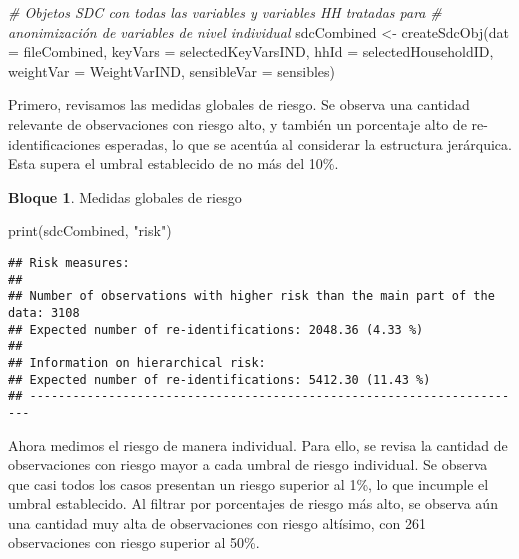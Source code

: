 \documentclass[
]{book}
\newenvironment{Shaded}{\begin{snugshade}}{\end{snugshade}}
\newcommand{\AttributeTok}[1]{\textcolor[rgb]{0.77,0.63,0.00}{#1}}
\newcommand{\CommentTok}[1]{\textcolor[rgb]{0.56,0.35,0.01}{\textit{#1}}}
\newcommand{\FunctionTok}[1]{\textcolor[rgb]{0.00,0.00,0.00}{#1}}
\newcommand{\NormalTok}[1]{#1}
\newcommand{\OtherTok}[1]{\textcolor[rgb]{0.56,0.35,0.01}{#1}}
\newcommand{\StringTok}[1]{\textcolor[rgb]{0.31,0.60,0.02}{#1}}
\theoremstyle{definition}
\theoremstyle{definition}
\newtheorem{example}{Bloque}[chapter]
\theoremstyle{definition}
\theoremstyle{definition}
\theoremstyle{remark}
\begin{document}
\begin{Shaded}
\begin{Highlighting}[]
\CommentTok{\# Objetos SDC con todas las variables y variables HH tratadas para}
\CommentTok{\# anonimización de variables de nivel individual}
\NormalTok{sdcCombined }\OtherTok{\textless{}{-}} \FunctionTok{createSdcObj}\NormalTok{(}\AttributeTok{dat =}\NormalTok{ fileCombined, }\AttributeTok{keyVars =}\NormalTok{ selectedKeyVarsIND,}
                            \AttributeTok{hhId =}\NormalTok{ selectedHouseholdID, }\AttributeTok{weightVar =}\NormalTok{ WeightVarIND,}
                            \AttributeTok{sensibleVar =}\NormalTok{ sensibles)}
\end{Highlighting}
\end{Shaded}

Primero, revisamos las medidas globales de riesgo. Se observa una cantidad relevante de observaciones con riesgo alto, y también un porcentaje alto de re-identificaciones esperadas, lo que se acentúa al considerar la estructura jerárquica. Esta supera el umbral establecido de no más del 10\%.

\begin{example}
\protect\hypertarget{exm:bloque49nbm}{}\label{exm:bloque49nbm}Medidas globales de riesgo
\end{example}

\begin{Shaded}
\begin{Highlighting}[]
\FunctionTok{print}\NormalTok{(sdcCombined, }\StringTok{"risk"}\NormalTok{)}
\end{Highlighting}
\end{Shaded}

\begin{verbatim}
## Risk measures:
## 
## Number of observations with higher risk than the main part of the data: 3108
## Expected number of re-identifications: 2048.36 (4.33 %)
## 
## Information on hierarchical risk:
## Expected number of re-identifications: 5412.30 (11.43 %)
## ----------------------------------------------------------------------
\end{verbatim}

Ahora medimos el riesgo de manera individual. Para ello, se revisa la cantidad de observaciones con riesgo mayor a cada umbral de riesgo individual. Se observa que casi todos los casos presentan un riesgo superior al 1\%, lo que incumple el umbral establecido. Al filtrar por porcentajes de riesgo más alto, se observa aún una cantidad muy alta de observaciones con riesgo altísimo, con 261 observaciones con riesgo superior al 50\%.
\end{document}
